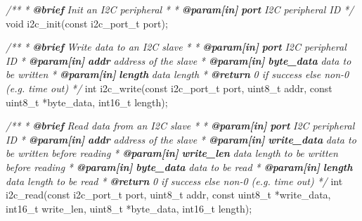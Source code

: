 \documentclass[
  12pt,
]{book}
\newenvironment{Shaded}{\begin{snugshade}}{\end{snugshade}}
\newcommand{\AnnotationTok}[1]{\textcolor[rgb]{0.56,0.35,0.01}{\textbf{\textit{#1}}}}
\newcommand{\CommentTok}[1]{\textcolor[rgb]{0.56,0.35,0.01}{\textit{#1}}}
\newcommand{\CommentVarTok}[1]{\textcolor[rgb]{0.56,0.35,0.01}{\textbf{\textit{#1}}}}
\newcommand{\DataTypeTok}[1]{\textcolor[rgb]{0.13,0.29,0.53}{#1}}
\newcommand{\NormalTok}[1]{#1}
\begin{document}
\begin{Shaded}
\begin{Highlighting}[]
\CommentTok{/**}
\CommentTok{ * }\AnnotationTok{@brief}\CommentTok{ Init an I2C peripheral}
\CommentTok{ *}
\CommentTok{ * }\AnnotationTok{@param[in]}\CommentTok{ }\CommentVarTok{port}\CommentTok{              I2C peripheral ID}
\CommentTok{ */}
\DataTypeTok{void}\NormalTok{ i2c_init(}\DataTypeTok{const}\NormalTok{ i2c_port_t port);}

\CommentTok{/**}
\CommentTok{ * }\AnnotationTok{@brief}\CommentTok{ Write data to an I2C slave}
\CommentTok{ *}
\CommentTok{ * }\AnnotationTok{@param[in]}\CommentTok{ }\CommentVarTok{port}\CommentTok{              I2C peripheral ID}
\CommentTok{ * }\AnnotationTok{@param[in]}\CommentTok{ }\CommentVarTok{addr}\CommentTok{              address of the slave}
\CommentTok{ * }\AnnotationTok{@param[in]}\CommentTok{ }\CommentVarTok{byte_data}\CommentTok{         data to be written}
\CommentTok{ * }\AnnotationTok{@param[in]}\CommentTok{ }\CommentVarTok{length}\CommentTok{            data length}
\CommentTok{ * }\AnnotationTok{@return}\CommentTok{                      0 if success else non-0 (e.g. time out)}
\CommentTok{ */}
\DataTypeTok{int}\NormalTok{ i2c_write(}\DataTypeTok{const}\NormalTok{ i2c_port_t port, }\DataTypeTok{uint8_t}\NormalTok{ addr, }\DataTypeTok{const} \DataTypeTok{uint8_t}\NormalTok{ *byte_data, }\DataTypeTok{int16_t}\NormalTok{ length);}

\CommentTok{/**}
\CommentTok{ * }\AnnotationTok{@brief}\CommentTok{ Read data from an I2C slave}
\CommentTok{ *}
\CommentTok{ * }\AnnotationTok{@param[in]}\CommentTok{ }\CommentVarTok{port}\CommentTok{              I2C peripheral ID}
\CommentTok{ * }\AnnotationTok{@param[in]}\CommentTok{ }\CommentVarTok{addr}\CommentTok{              address of the slave}
\CommentTok{ * }\AnnotationTok{@param[in]}\CommentTok{ }\CommentVarTok{write_data}\CommentTok{        data to be written before reading}
\CommentTok{ * }\AnnotationTok{@param[in]}\CommentTok{ }\CommentVarTok{write_len}\CommentTok{         data length to be written before reading}
\CommentTok{ * }\AnnotationTok{@param[in]}\CommentTok{ }\CommentVarTok{byte_data}\CommentTok{         data to be read}
\CommentTok{ * }\AnnotationTok{@param[in]}\CommentTok{ }\CommentVarTok{length}\CommentTok{            data length to be read}
\CommentTok{ * }\AnnotationTok{@return}\CommentTok{                      0 if success else non-0 (e.g. time out)}
\CommentTok{ */}
\DataTypeTok{int}\NormalTok{ i2c_read(}\DataTypeTok{const}\NormalTok{ i2c_port_t port, }\DataTypeTok{uint8_t}\NormalTok{ addr, }\DataTypeTok{const} \DataTypeTok{uint8_t}\NormalTok{ *write_data, }\DataTypeTok{int16_t}\NormalTok{ write_len, }
              \DataTypeTok{uint8_t}\NormalTok{ *byte_data, }\DataTypeTok{int16_t}\NormalTok{ length);}
\end{Highlighting}
\end{Shaded}
\end{document}
